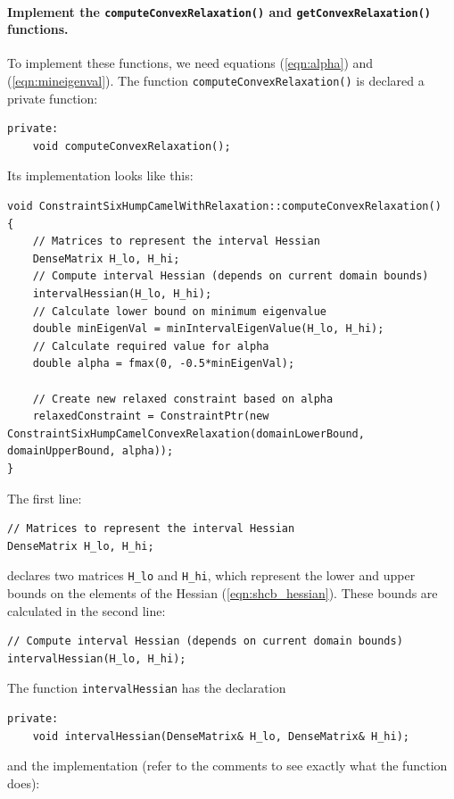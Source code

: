 \paragraph{Implement the \texttt{computeConvexRelaxation()} and \texttt{getConvexRelaxation()} functions.} To implement these functions, we need equations (\ref{eqn:alpha}) and (\ref{eqn:mineigenval}). The function \texttt{computeConvexRelaxation()} is declared a private function:
\begin{lstlisting}
private:
	void computeConvexRelaxation();
\end{lstlisting}
Its implementation looks like this:
\begin{lstlisting}
void ConstraintSixHumpCamelWithRelaxation::computeConvexRelaxation()
{
	// Matrices to represent the interval Hessian
	DenseMatrix H_lo, H_hi;
	// Compute interval Hessian (depends on current domain bounds)
	intervalHessian(H_lo, H_hi);
	// Calculate lower bound on minimum eigenvalue
	double minEigenVal = minIntervalEigenValue(H_lo, H_hi);
	// Calculate required value for alpha
	double alpha = fmax(0, -0.5*minEigenVal);

	// Create new relaxed constraint based on alpha
	relaxedConstraint = ConstraintPtr(new ConstraintSixHumpCamelConvexRelaxation(domainLowerBound, domainUpperBound, alpha));
}
\end{lstlisting}
The first line:
\begin{lstlisting}
// Matrices to represent the interval Hessian
DenseMatrix H_lo, H_hi;
\end{lstlisting}
declares two matrices \texttt{H\_lo} and \texttt{H\_hi}, which represent the lower and upper bounds on the elements of the Hessian (\ref{eqn:shcb_hessian}). These bounds are calculated in the second line:
\begin{lstlisting}
// Compute interval Hessian (depends on current domain bounds)
intervalHessian(H_lo, H_hi);
\end{lstlisting}
The function \texttt{intervalHessian} has the declaration
\begin{lstlisting}
private:
	void intervalHessian(DenseMatrix& H_lo, DenseMatrix& H_hi);
\end{lstlisting}
and the implementation (refer to the comments to see exactly what the function does):
